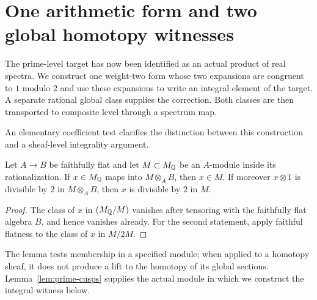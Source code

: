 \section{One arithmetic form and two global homotopy witnesses}\label{sec:joint}

The prime-level target has now been identified as an actual product
of real spectra. We construct one weight-two form whose two expansions
are congruent to $1$ modulo $2$ and use these expansions to write an
integral element of the target. A separate rational global class
supplies the correction. Both classes are then transported to composite
level through a spectrum map.

An elementary coefficient test clarifies the distinction between this
construction and a sheaf-level integrality argument.
\begin{lemma}\label{lem:ff-integral}
Let $A\to B$ be faithfully flat and let $M\subset M_\mathbb Q$ be an $A$-module inside its
rationalization.  If $x\in M_\mathbb Q$ maps into $M\otimes_A B$, then $x\in M$.  If moreover
$x\otimes1$ is divisible by $2$ in $M\otimes_A B$, then $x$ is divisible by $2$ in $M$.
\end{lemma}

\begin{proof}
The class of $x$ in $(M_\mathbb Q/M)$ vanishes after tensoring with the
faithfully flat algebra $B$, and hence vanishes already. For the second
statement, apply faithful flatness to the class of $x$ in $M/2M$.
\end{proof}
The lemma tests membership in a specified module; when applied to a
homotopy sheaf, it does not produce a lift to the homotopy of its global
sections. Lemma~\ref{lem:prime-cusps} supplies the actual module in
which we construct the integral witness below.

